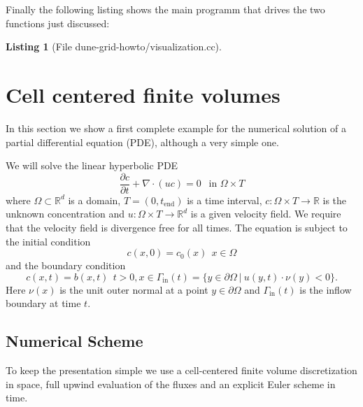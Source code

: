 \documentclass[11pt,a4paper,headinclude,footinclude,DIV16,normalheadings]{scrreprt}
\newtheorem{lst}{Listing}
\begin{document}
Finally the following listing shows the main programm that drives the
two functions just discussed:

\begin{lst}[File dune-grid-howto/visualization.cc] \mbox{}
\nopagebreak

\end{lst}

\section{Cell centered finite volumes}
\label{Sec:CellCenteredFV}

In this section we show a first complete example for the numerical
solution of a partial differential equation (PDE), although a very simple
one.

We will solve the linear hyperbolic PDE
\begin{equation}
\frac{\partial c}{\partial t} + \nabla\cdot (uc) = 0 \ \ \text{ in
  $\Omega\times T$}
\label{Eq:TransportEquation}
\end{equation}
where $\Omega\subset\mathbb{R}^d$ is a domain, $T=(0,t_{\text{end}})$
is a time interval,
$c:\Omega\times T\to\mathbb{R}$ is the unknown concentration and
$u:\Omega\times T\to\mathbb{R}^d$ is a given velocity field. We
require that the velocity field is divergence free for all times.
The equation is subject to the initial condition
\begin{equation}
c(x,0) = c_0(x) \ \ x\in\Omega
\end{equation}
and the boundary condition
\begin{equation}
c(x,t) = b(x,t) \ \ t>0, x\in\Gamma_{\text{in}}(t)=\{y\in\partial\Omega\
|\ u(y,t)\cdot\nu(y)<0\}. 
\end{equation}
Here $\nu(x)$ is the unit outer normal at a point $y\in\partial\Omega$
and $\Gamma_{\text{in}}(t)$ is the inflow boundary at time $t$.

\subsection{Numerical Scheme}

To keep the presentation simple we use a cell-centered finite volume
discretization in space, full upwind evaluation of the fluxes and an
explicit Euler scheme in time.
\end{document}
